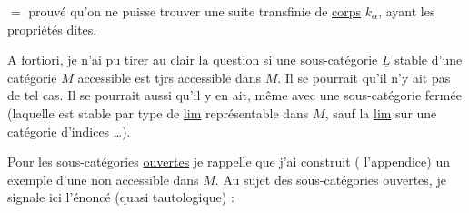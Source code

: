 

$=$ prouvé qu'on ne puisse trouver une suite transfinie de \uline{corps} $k_\alpha$, ayant les propriétés dites.

A fortiori, je n'ai pu tirer au clair la question si une sous-catégorie $\underline L$ stable d'une catégorie $M$ accessible est tjrs%
 accessible dans $M$. Il se pourrait qu'il n'y ait pas de tel cas. Il se pourrait aussi qu'il y en ait, même avec une sous-catégorie fermée (laquelle est stable par  type de \uline{lim} représentable dans $M$, sauf la \uline{lim} sur une catégorie d'indices \ldots).

Pour les sous-catégories \uline{ouvertes} je rappelle que j'ai construit ( l'appendice) un exemple d'une   non accessible dans $M$. Au sujet des sous-catégories ouvertes, je signale ici l'énoncé (quasi tautologique) :

